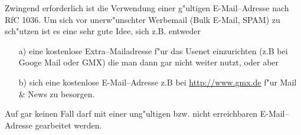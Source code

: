 Zwingend erforderlich ist die Verwendung einer g"ultigen E-Mail--Adresse nach
\glossar RfC 1036. Um sich vor unerw"unschter Werbemail (Bulk E-Mail, SPAM) zu
sch"utzen ist es eine sehr gute Idee, sich z.B. entweder
\begin{enumerate}
  \item[a)] eine kostenlose Extra--Mailadresse f"ur das Usenet einzurichten
    (z.B bei Googe Mail oder GMX) die man dann gar nicht weiter nutzt, oder aber
  \item[b)] sich eine kostenlose E-Mail--Adresse z.B bei \url{http://www.gmx.de} f"ur
    Mail \& News zu besorgen.
\end{enumerate}
Auf gar keinen Fall darf mit einer ung"ultigen bzw. nicht erreichbaren
E-Mail--Adresse gearbeitet werden.

